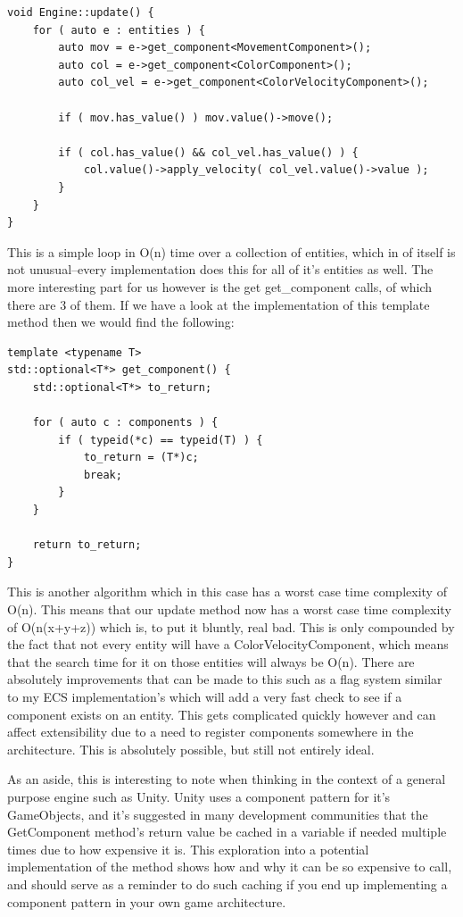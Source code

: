 \documentclass{article}
\begin{document}
\bigskip

\begin{BVerbatim}
void Engine::update() {
    for ( auto e : entities ) {
        auto mov = e->get_component<MovementComponent>();
        auto col = e->get_component<ColorComponent>();
        auto col_vel = e->get_component<ColorVelocityComponent>();

        if ( mov.has_value() ) mov.value()->move();

        if ( col.has_value() && col_vel.has_value() ) {
            col.value()->apply_velocity( col_vel.value()->value );
        }
    }
}
\end{BVerbatim}

\bigskip

This is a simple loop in O(n) time over a collection of entities, which in of
itself is not unusual--every implementation does this for all of it's entities
as well. The more interesting part for us however is the get get\_component
calls, of which there are 3 of them. If we have a look at the implementation of
this template method then we would find the following:

\bigskip

\begin{BVerbatim}
template <typename T>
std::optional<T*> get_component() {
    std::optional<T*> to_return;

    for ( auto c : components ) {
        if ( typeid(*c) == typeid(T) ) {
            to_return = (T*)c;
            break;
        }
    }

    return to_return;
}
\end{BVerbatim}

\bigskip

This is another algorithm which in this case has a worst case time complexity
of O(n). This means that our update method now has a worst case time complexity
of O(n(x+y+z)) which is, to put it bluntly, real bad. This is only compounded by
the fact that not every entity will have a ColorVelocityComponent, which means
that the search time for it on those entities will always be O(n). There are
absolutely improvements that can be made to this such as a flag system similar
to my ECS implementation's which will add a very fast check to see if a
component exists on an entity. This gets complicated quickly however and can
affect extensibility due to a need to register components somewhere in the
architecture. This is absolutely possible, but still not entirely ideal.

As an aside, this is interesting to note when thinking in the context of a
general purpose engine such as Unity. Unity uses a component pattern for it's
GameObjects, and it's suggested in many development communities that the
GetComponent method's return value be cached in a variable if needed multiple
times due to how expensive it is. This exploration into a potential
implementation of the method shows how and why it can be so expensive to call,
and should serve as a reminder to do such caching if you end up implementing a
component pattern in your own game architecture.
\end{document}
